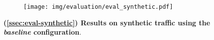 \begin{figure}[H]
\centering
\vspace{-0.5em}
\captionsetup{justification=centering}
\begin{subfigure}{0.99 \columnwidth}
\centering
\texttt{[image: img/evaluation/eval\_synthetic.pdf]}
\end{subfigure}
\caption{\textbf{(\textsection \ref{ssec:eval-synthetic}) Results on synthetic traffic using the \textit{baseline} configuration}.}
\label{fig:eval-synthetic}
\vspace{-1em}
\end{figure}
